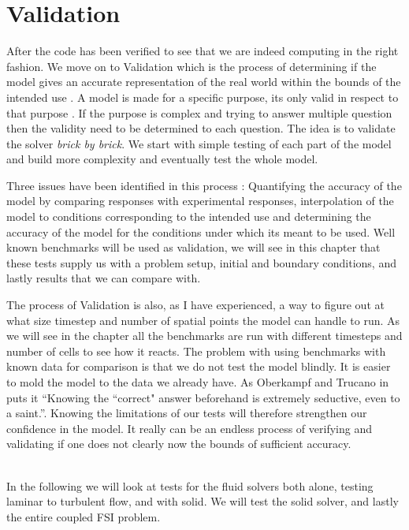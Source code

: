 
\newpage

\section{Validation}
After the code has been verified to see that we are indeed computing in the right fashion. We move on to Validation which is the process of determining if the model gives an accurate representation of the real world within the bounds of the intended use \cite{Selin2014}. A model is made for a specific purpose, its only valid in respect to that purpose \cite{Macal2005}. If the purpose is complex and trying to answer multiple question then the validity need to be determined to each question. The idea is to validate the solver \textsl{brick by brick}. We start with simple testing of each part of the model and build more complexity and eventually test the whole model.\newline

Three issues have been identified in this process \cite{Selin2014}: Quantifying the accuracy of the model by comparing responses with experimental responses, interpolation of the model to conditions corresponding to the intended use and determining the accuracy of the model for the conditions under which its meant to be used. Well known benchmarks will be used as validation, we will see in this chapter that these tests supply us with a problem setup, initial and boundary conditions, and lastly results that we can compare with. \newline

The process of Validation is also, as I have experienced, a way to figure out at what size timestep and number of spatial points the model can handle to run. As we will see in the chapter all the benchmarks are run with different timesteps and number of cells to see how it reacts. The problem with using benchmarks with known data for comparison is that we do not test the model blindly. It is easier to mold the model to the data we already have. As Oberkampf and Trucano in \cite{Selin2014} puts it ``Knowing the ``correct" answer beforehand is extremely seductive, even to a saint.''. Knowing the limitations of our tests will therefore strengthen our confidence in the model. It really can be an endless process of verifying and validating if one does not clearly now the bounds of sufficient accuracy. 

\cite{Selin2014} \\
In the following we will look at tests for the fluid solvers both alone, testing laminar to turbulent flow, and with solid. We will test the solid solver, and lastly the entire coupled FSI problem. 


%













